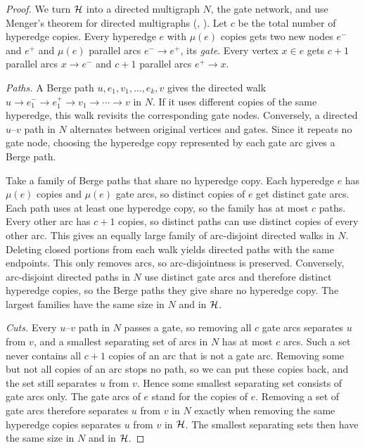 \begin{proof}
We turn $\mathcal{H}$ into a directed multigraph $N$, the gate network, and use Menger's theorem for directed multigraphs (, \cite[Theorem~6.2.2 and Corollary~6.2.3]{Diestel25}).
Let $c$ be the total number of hyperedge copies.
Every hyperedge $e$ with $\mu(e)$ copies gets two new nodes $e^-$ and $e^+$ and $\mu(e)$ parallel arcs $e^- \to e^+$, its \emph{gate}.
Every vertex $x \in e$ gets $c+1$ parallel arcs $x \to e^-$ and $c+1$ parallel arcs $e^+ \to x$.

\emph{Paths.} A Berge path $u, e_1, v_1, \dots, e_k, v$ gives the directed walk $u \to e_1^- \to e_1^+ \to v_1 \to \cdots \to v$ in $N$. If it uses different copies of the same hyperedge, this walk revisits the corresponding gate nodes.
Conversely, a directed $u$--$v$ path in $N$ alternates between original vertices and gates. Since it repeats no gate node, choosing the hyperedge copy represented by each gate arc gives a Berge path.

Take a family of Berge paths that share no hyperedge copy.
Each hyperedge $e$ has $\mu(e)$ copies and $\mu(e)$ gate arcs, so distinct copies of $e$ get distinct gate arcs.
Each path uses at least one hyperedge copy, so the family has at most $c$ paths. Every other arc has $c+1$ copies, so distinct paths can use distinct copies of every other arc.
This gives an equally large family of arc-disjoint directed walks in $N$. Deleting closed portions from each walk yields directed paths with the same endpoints. This only removes arcs, so arc-disjointness is preserved.
Conversely, arc-disjoint directed paths in $N$ use distinct gate arcs and therefore distinct hyperedge copies, so the Berge paths they give share no hyperedge copy.
The largest families have the same size in $N$ and in $\mathcal{H}$.

\emph{Cuts.} Every $u$--$v$ path in $N$ passes a gate, so removing all $c$ gate arcs separates $u$ from $v$, and a smallest separating set of arcs in $N$ has at most $c$ arcs.
Such a set never contains all $c+1$ copies of an arc that is not a gate arc.
Removing some but not all copies of an arc stops no path, so we can put these copies back, and the set still separates $u$ from $v$.
Hence some smallest separating set consists of gate arcs only.
The gate arcs of $e$ stand for the copies of $e$.
Removing a set of gate arcs therefore separates $u$ from $v$ in $N$ exactly when removing the same hyperedge copies separates $u$ from $v$ in $\mathcal{H}$.
The smallest separating sets then have the same size in $N$ and in $\mathcal{H}$.


\end{proof}
